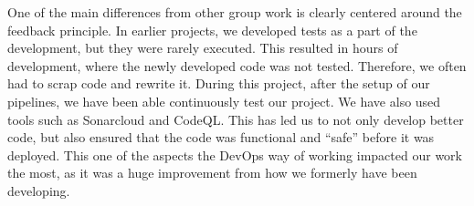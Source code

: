 One of the main differences from other group work is clearly centered around the feedback principle. In earlier projects, we developed tests as a part of the development, but they were rarely executed. This resulted in hours of development, where the newly developed code was not tested. Therefore, we often had to scrap code and rewrite it. During this project, after the setup of our pipelines, we have been able continuously test our project. We have also used tools such as Sonarcloud and CodeQL. This has led us to not only develop better code, but also ensured that the code was functional and “safe” before it was deployed. This one of the aspects the DevOps way of working impacted our work the most, as it was a huge improvement from how we formerly have been developing.
